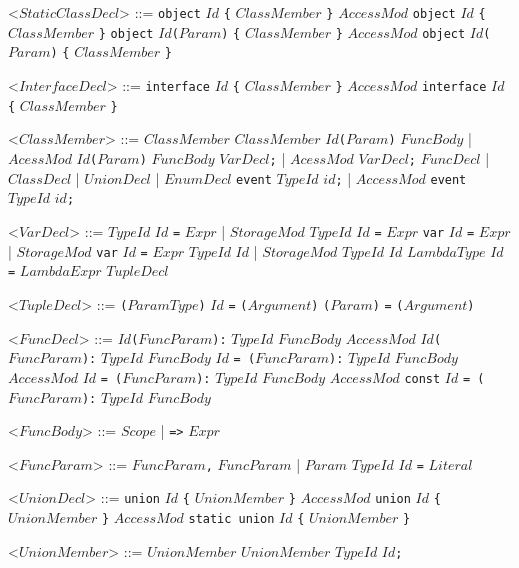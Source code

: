 \documentclass{article}
\newcommand{\gtext}[1]{<$#1$>}
\newcommand{\glit}[1]{\texttt{#1}}
\begin{document}
\begin{grammar}
	\gtext{StaticClassDecl} ::= \glit{object} $Id$ \glit{\{} $ClassMember$ \glit{\}}
	\alt $AccessMod$ \glit{object} $Id$ \glit{\{} $ClassMember$ \glit{\}}
	\alt \glit{object} $Id$\glit{(}$Param$\glit{)} \glit{\{} $ClassMember$ \glit{\}}
	\alt $AccessMod$ \glit{object} $Id$\glit{(}$Param$\glit{)} \glit{\{} $ClassMember$ \glit{\}}
	
	\gtext{InterfaceDecl} ::= \glit{interface} $Id$ \glit{\{} $ClassMember$ \glit{\}}
	\alt $AccessMod$ \glit{interface} $Id$ \glit{\{} $ClassMember$ \glit{\}}
	
	\gtext{ClassMember} ::= $ClassMember$ $ClassMember$
	\alt $Id$\glit{(}$Param$\glit{)} $FuncBody$ | $AcessMod$ $Id$\glit{(}$Param$\glit{)} $FuncBody$ %
	\alt $VarDecl$\glit{;} | $AcessMod$ $VarDecl$\glit{;}
	\alt $FuncDecl$ | $ClassDecl$ | $UnionDecl$ | $EnumDecl$
	\alt \glit{event} $TypeId$ $id$\glit{;} | $AccessMod$ \glit{event} $TypeId$ $id$\glit{;}
	
	\newpage	
	
	\gtext{VarDecl} ::= $TypeId$ $Id$ \glit{=} $Expr$ | $StorageMod$ $TypeId$ $Id$ \glit{=} $Expr$
	\alt \glit{var} $Id$ \glit{=} $Expr$ | $StorageMod$ \glit{var} $Id$ \glit{=} $Expr$
	\alt $TypeId$ $Id$ | $StorageMod$ $TypeId$ $Id$
	\alt $LambdaType$ $Id$ \glit{=} $LambdaExpr$
	\alt $TupleDecl$

	\gtext{TupleDecl} ::= \glit{(}$ParamType$\glit{)} $Id$ \glit{=} \glit{(}$Argument$\glit{)}
	\alt \glit{(}$Param$\glit{)} \glit{=} \glit{(}$Argument$\glit{)}

	\gtext{FuncDecl} ::=  $Id$\glit{(}$FuncParam$\glit{):} $TypeId$ $FuncBody$ %
	\alt $AccessMod$ $Id$\glit{(}$FuncParam$\glit{):} $TypeId$ $FuncBody$ %
	\alt $Id$ \glit{= (}$FuncParam$\glit{):} $TypeId$ $FuncBody$  %
	\alt $AccessMod$ $Id$ \glit{= (}$FuncParam$\glit{):} $TypeId$ $FuncBody$  %
	\alt $AccessMod$ \glit{const} $Id$ \glit{= (}$FuncParam$\glit{):} $TypeId$ $FuncBody$  %
	
	\gtext{FuncBody} ::= $Scope$ | \glit{=>} $Expr$
	
	\gtext{FuncParam} ::= $FuncParam$\glit{,} $FuncParam$ | $Param$
	\alt $TypeId$ $Id$ \glit{=} $Literal$	
	
	\gtext{UnionDecl} ::= \glit{union} $Id$ \glit{\{} $UnionMember$ \glit{\}}
	\alt $AccessMod$ \glit{union} $Id$ \glit{\{} $UnionMember$ \glit{\}}
	\alt $AccessMod$ \glit{static union} $Id$ \glit{\{} $UnionMember$ \glit{\}}
	
	\gtext{UnionMember} ::= $UnionMember$ $UnionMember$
	\alt $TypeId$ $Id$\glit{;}	
	

\end{grammar}
\end{document}
